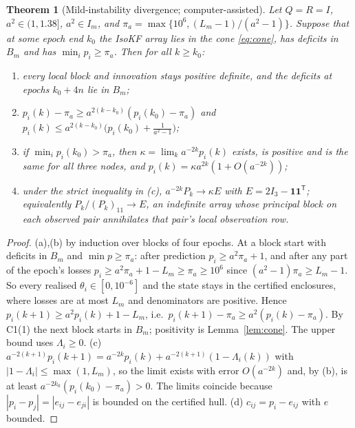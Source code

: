\documentclass[11pt,a4paper]{article}
\numberwithin{equation}{section}
\newtheorem{theorem}{Theorem}[section]
\theoremstyle{remark}\newtheorem{remark}[theorem]{Remark}
\newcommand{\T}{^{\mathsf T}}
\newcommand{\one}{\mathbf 1}
\begin{document}
\begin{theorem}[Mild-instability divergence; computer-assisted]\label{thm:mild}
Let $Q=R=I$, $a^2\in(1,1.38]$, $a^2\in I_m$, and
$\pi_a=\max\{10^6,(L_m-1)/(a^2-1)\}$. Suppose that at some epoch end $k_0$ the IsoKF array lies
in the cone \eqref{eq:cone}, has deficits in $B_m$ and has $\min_ip_i\ge\pi_a$. Then for all
$k\ge k_0$:
\begin{enumerate}[label=(\alph*)]
\item every local block and innovation stays positive definite, and the deficits at epochs
$k_0+4n$ lie in $B_m$;
\item $p_i(k)-\pi_a\ge a^{2(k-k_0)}(p_i(k_0)-\pi_a)$ and
$p_i(k)\le a^{2(k-k_0)}\big(p_i(k_0)+\frac1{a^2-1}\big)$;
\item if $\min_ip_i(k_0)>\pi_a$, then $\kappa=\lim_ka^{-2k}p_i(k)$ exists, is positive and is the
same for all three nodes, and $p_i(k)=\kappa a^{2k}(1+O(a^{-2k}))$;
\item under the strict inequality in (c), $a^{-2k}P_k\to\kappa E$ with $E=2I_3-\one\one\T$; equivalently $P_k/(P_k)_{11}\to E$, an
indefinite array whose principal block on each observed pair annihilates that pair's local observation row.
\end{enumerate}
\end{theorem}

\begin{proof}
(a),(b) by induction over blocks of four epochs. At a block start with deficits in $B_m$ and
$\min p\ge\pi_a$: after prediction $p_i\ge a^2\pi_a+1$, and after any part of the epoch's
losses $p_i\ge a^2\pi_a+1-L_m\ge\pi_a\ge10^6$ since $(a^2-1)\pi_a\ge L_m-1$. So every realised
$\theta_i\in[0,10^{-6}]$ and the state stays in the certified enclosures, where losses are at
most $L_m$ and denominators are positive. Hence $p_i(k+1)\ge a^2p_i(k)+1-L_m$, i.e.\
$p_i(k+1)-\pi_a\ge a^2(p_i(k)-\pi_a)$. By C1(1) the next block starts in $B_m$; positivity is
Lemma~\ref{lem:cone}. The upper bound uses $\Lambda_i\ge0$.
(c) $a^{-2(k+1)}p_i(k+1)=a^{-2k}p_i(k)+a^{-2(k+1)}(1-\Lambda_i(k))$ with $|1-\Lambda_i|\le
\max(1,L_m)$, so the limit exists with error $O(a^{-2k})$ and, by (b), is at least
$a^{-2k_0}(p_i(k_0)-\pi_a)>0$. The limits coincide because $|p_i-p_j|=|e_{ij}-e_{ji}|$ is
bounded on the certified hull.
(d) $c_{ij}=p_i-e_{ij}$ with $e$ bounded.
\end{proof}
\end{document}
